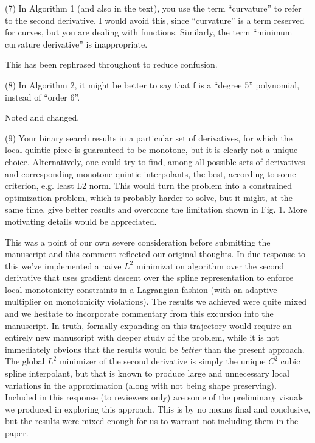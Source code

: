 \goodbreak
{\parindent=20pt \it
  
\item{(7)} In Algorithm 1 (and also in the text), you use the term
  ``curvature'' to refer to the second derivative. I would avoid this,
  since ``curvature'' is a term reserved for curves, but you are dealing
  with functions. Similarly, the term ``minimum curvature derivative''
  is inappropriate.

}

This has been rephrased throughout to reduce confusion.


\goodbreak
{\parindent=20pt \it
  
\item{(8)} In Algorithm 2, it might be better to say that f is a
  ``degree 5'' polynomial, instead of ``order 6''.

}

Noted and changed.

{\parindent=20pt \it
  
\item{(9)} Your binary search results in a particular set of
  derivatives, for which the local quintic piece is guaranteed to be
  monotone, but it is clearly not a unique choice. Alternatively, one
  could try to find, among all possible sets of derivatives and
  corresponding monotone quintic interpolants, the best, according to
  some criterion, e.g. least L2 norm. This would turn the problem into
  a constrained optimization problem, which is probably harder to
  solve, but it might, at the same time, give better results and
  overcome the limitation shown in Fig. 1. More motivating details
  would be appreciated.

}

This was a point of our own severe consideration before submitting the
manuscript and this comment reflected our original thoughts. In due
response to this we've implemented a naive $L^2$ minimization algorithm
over the second derivative that uses gradient descent over the spline
representation to enforce local monotonicity constraints in a
Lagrangian fashion (with an adaptive multiplier on monotonicity
violations). The results we achieved were quite mixed and we hesitate
to incorporate commentary from this excursion into the manuscript. In
truth, formally expanding on this trajectory would require an entirely
new manuscript with deeper study of the problem, while it is not
immediately obvious that the results would be {\it better} than the
present approach. The global $L^2$ minimizer of the second derivative
is simply the unique $C^2$ cubic spline interpolant, but that is known
to produce large and unnecessary local variations in the approximation
(along with not being shape preserving). Included in this response (to
reviewers only) are some of the preliminary visuals we produced in
exploring this approach. This is by no means final and conclusive, but
the results were mixed enough for us to warrant not including them in
the paper.

